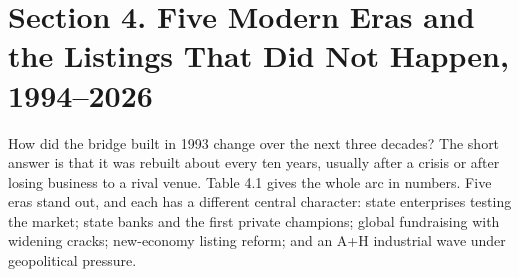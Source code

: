 \documentclass[11pt,letterpaper]{article}
\begin{document}
\section*{\texorpdfstring{Section 4. Five Modern Eras and the Listings That Did Not Happen, 1994–2026}{Section 4. Five Modern Eras and the Listings That Did Not Happen, 1994–2026}}
How did the bridge built in 1993 change over the next three decades? The short answer is that it was rebuilt about every ten years, usually after a crisis or after losing business to a rival venue. Table 4.1 gives the whole arc in numbers. Five eras stand out, and each has a different central character: state enterprises testing the market; state banks and the first private champions; global fundraising with widening cracks; new-economy listing reform; and an A+H industrial wave under geopolitical pressure.
\end{document}
